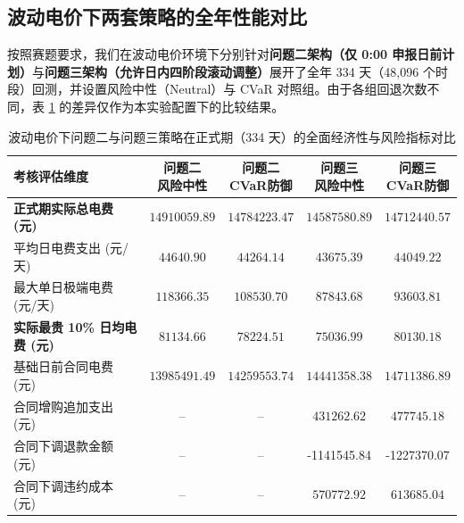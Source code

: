 \documentclass[withoutpreface]{cumcmthesis}
\begin{document}
\subsection{波动电价下两套策略的全年性能对比}
按照赛题要求，我们在波动电价环境下分别针对\textbf{问题二架构（仅 0:00 申报日前计划）}与\textbf{问题三架构（允许日内四阶段滚动调整）}展开了全年 334 天（48,096 个时段）回测，并设置风险中性（Neutral）与 CVaR 对照组。由于各组回退次数不同，表 \ref{tab:q4_annual_comparison} 的差异仅作为本实验配置下的比较结果。

\begin{table}[htbp]
\centering
\small %
\renewcommand{\arraystretch}{1.2}
\setlength{\tabcolsep}{3.5pt} %
\caption{波动电价下问题二与问题三策略在正式期（334 天）的全面经济性与风险指标对比}
\label{tab:q4_annual_comparison}
\begin{tabular*}{\textwidth}{@{\extracolsep{\fill}}lcccc@{}}
\toprule[1.5pt]
考核评估维度 & \shortstack{问题二\\风险中性} & \shortstack{问题二\\CVaR防御} & \shortstack{问题三\\风险中性} & \shortstack{问题三\\CVaR防御} \\
\midrule[1pt]
\textbf{正式期实际总电费 (元)} & $14910059.89$ & $\mathbf{14784223.47}$ & $\mathbf{14587580.89}$ & $14712440.57$ \\
平均日电费支出 (元/天)        & $44640.90$    & $44264.14$            & $43675.39$            & $44049.22$    \\
最大单日极端电费 (元/天)      & $118366.35$   & $\mathbf{108530.70}$   & $\mathbf{87843.68}$   & $93603.81$    \\
\textbf{实际最贵 10\% 日均电费 (元)} & $81134.66$ & $\mathbf{78224.51}$   & $\mathbf{75036.99}$   & $80130.18$    \\
\midrule[0.5pt]
基础日前合同电费 (元)        & $13985491.49$ & $14259553.74$          & $14441358.38$          & $14711386.89$ \\
合同增购追加支出 (元)        & --            & --                     & $431262.62$           & $477745.18$   \\
合同下调退款金额 (元)        & --            & --                     & -1141545.84           & -1227370.07   \\
合同下调违约成本 (元)        & --            & --                     & $570772.92$           & $613685.04$   \\

\end{tabular*}
\end{table}
\end{document}
